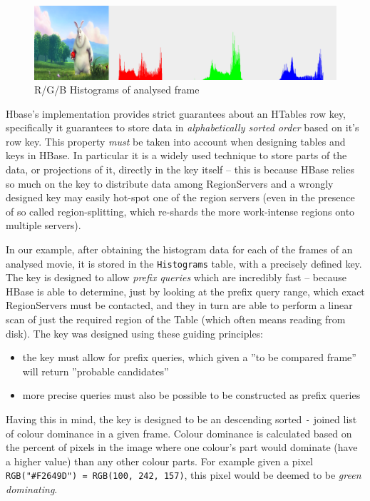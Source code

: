 \begin{figure}[ch!]
  \centering
  \includegraphics[width=\textwidth]{img/Histograms__Big_Buck_Bunny_mirror_png.png}
  \caption{R/G/B Histograms of analysed frame}
\end{figure}

Hbase's implementation provides strict guarantees about an HTables row key, specifically it guarantees to store data in \textit{alphabetically sorted order} based on it's row key. This property \textit{must} be taken into account when designing tables and keys in HBase. In particular it is a widely used technique to store parts of the data, or projections of it, directly in the key itself -- this is because HBase relies so much on the key to distribute data among RegionServers and a wrongly designed key may easily hot-spot one of the region servers (even in the presence of so called region-splitting, which re-shards the more work-intense regions onto multiple servers).

In our example, after obtaining the histogram data for each of the frames of an analysed movie, it is stored in the \verb|Histograms| table, with a precisely defined key. The key is designed to allow \textit{prefix queries} which are incredibly fast -- because HBase is able to determine, just by looking at the prefix query range, which exact RegionServers must be contacted, and they in turn are able to perform a linear scan of just the required region of the Table (which often means reading from disk). The key was designed using these guiding principles:

\begin{itemize}
 \item the key must allow for prefix queries, which given a ''to be compared frame'' will return ''probable candidates''
 \item more precise queries must also be possible to be constructed as prefix queries
\end{itemize}

Having this in mind, the key is designed to be an descending sorted \verb|-| joined list of colour dominance in a given frame. Colour dominance is calculated based on the percent of pixels in the image where one colour's part would dominate (have a higher value) than any other colour parts. For example given a pixel  \verb|RGB("#F2649D") = RGB(100, 242, 157)|, this pixel would be deemed to be \textit{green dominating}. 

